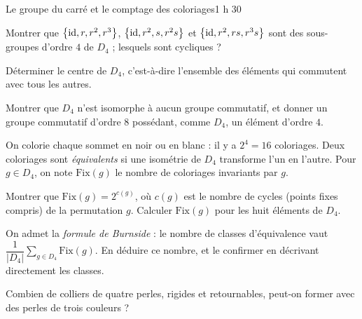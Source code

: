 \begin{defi}{Le groupe du carré et le comptage des coloriages}{1 h 30}
\begin{questions}[resume]
  \item Montrer que $\left\{\mathrm{id},r,r^{2},r^{3}\right\}$,
    $\left\{\mathrm{id},r^{2},s,r^{2}s\right\}$ et
    $\left\{\mathrm{id},r^{2},rs,r^{3}s\right\}$ sont des sous-groupes d'ordre $4$
    de $D_4$ ; lesquels sont cycliques ?
  \item Déterminer le centre de $D_4$, c'est-à-dire l'ensemble des
    éléments qui commutent avec tous les autres.
  \item Montrer que $D_4$ n'est isomorphe à aucun groupe commutatif, et
    donner un groupe commutatif d'ordre $8$ possédant, comme $D_4$, un
    élément d'ordre $4$.
\end{questions}

On colorie chaque sommet en noir ou en blanc : il y a $2^{4}=16$
coloriages. Deux coloriages sont \emph{équivalents} si une isométrie de
$D_4$ transforme l'un en l'autre. Pour $g\in D_4$, on note $\mathrm{Fix}(g)$
le nombre de coloriages invariants par $g$.
\begin{questions}[resume]
  \item Montrer que $\mathrm{Fix}(g)=2^{c(g)}$, où $c(g)$ est le nombre de
    cycles (points fixes compris) de la permutation $g$. Calculer
    $\mathrm{Fix}(g)$ pour les huit éléments de $D_4$.
  \item On admet la \emph{formule de Burnside} : le nombre de classes
    d'équivalence vaut $\dfrac{1}{|D_4|}\displaystyle\sum_{g\in D_4}\mathrm{Fix}(g)$.
    En déduire ce nombre, et le confirmer en décrivant directement les
    classes.
  \item Combien de colliers de quatre perles, rigides et retournables,
    peut-on former avec des perles de trois couleurs ?
\end{questions}
\end{defi}
